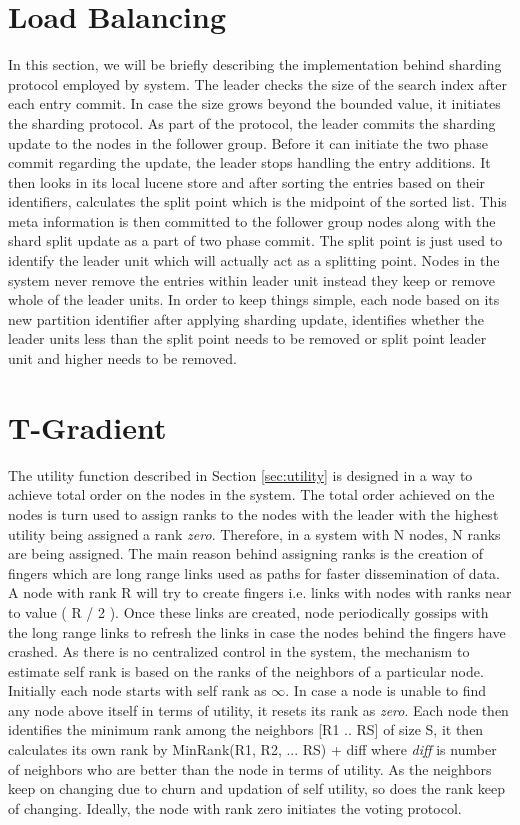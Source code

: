 \documentclass[a4paper,11pt]{kth-mag}
\begin{document}
\section{Load Balancing}
\label{sec:loadBalanceImpl}

In this section, we will be briefly describing the implementation behind sharding protocol employed by system. The leader checks the size of the search index after each entry commit. In case the size grows beyond the bounded value, it initiates the sharding protocol. As part of the protocol, the leader commits the sharding update to the nodes in the follower group. Before it can initiate the two phase commit regarding the update, the leader stops handling the entry additions. It then looks in its local lucene store and after sorting the entries based on their identifiers, calculates the split point which is the midpoint of the sorted list. This meta information is then committed to the follower group nodes along with the shard split update as a part of two phase commit. The split point is just used to identify the leader unit which will actually act as a splitting point. Nodes in the system never remove the entries within leader unit instead they keep or remove whole of the leader units. In order to keep things simple, each node based on its new partition identifier after applying sharding update, identifies whether the leader units less than the split point needs to be removed or split point leader unit and higher needs to be removed.


\section{T-Gradient}

The utility function described in Section \ref{sec:utility} is designed in a way to achieve total order on the nodes in the system. The total order achieved on the nodes is turn used to assign ranks to the nodes with the leader with the highest utility being assigned a rank \textit{zero}. Therefore, in a system with N nodes, N ranks are being assigned. The main reason behind assigning ranks is the creation of fingers which are long range links used as paths for faster dissemination of data. A node with rank R will try to create fingers i.e. links with nodes with ranks near to value ( R / 2 ). Once these links are created, node periodically gossips with the long range links to refresh the links in case the nodes behind the fingers have crashed. As there is no centralized control in the system, the mechanism to estimate self rank is based on the ranks of the neighbors of a particular node. Initially each node starts with self rank as $ \infty $. In case a node is unable to find any node above itself in terms of utility, it resets its rank as \textit{zero}. Each node then identifies the minimum rank among the neighbors [R1 .. RS] of size S, it then calculates its own rank by MinRank(R1, R2, ... RS) + diff  where \textit{diff} is number of neighbors who are better than the node in terms of utility. As the neighbors keep on changing due to churn and updation of self utility, so does the rank keep of changing. Ideally, the node with rank zero initiates the voting protocol.
\end{document}
